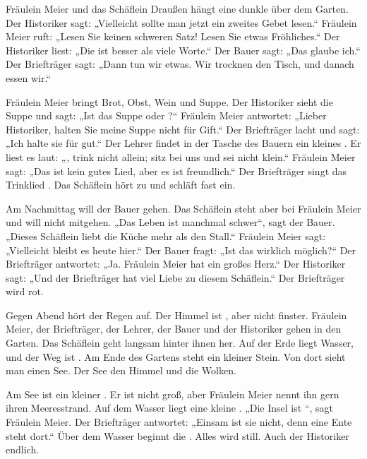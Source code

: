 \documentclass[12pt]{nextbook}
\begin{document}
\begin{readersection}{Fräulein Meier und das Schäflein}
Draußen hängt eine dunkle  über dem Garten. Der Historiker sagt: „Vielleicht sollte man jetzt ein zweites Gebet lesen.“ Fräulein Meier ruft: „Lesen Sie keinen schweren Satz! Lesen Sie etwas Fröhliches.“ Der Historiker liest: „Die  ist besser als viele Worte.“ Der Bauer sagt: „Das glaube ich.“ Der Briefträger sagt: „Dann tun wir etwas. Wir trocknen den Tisch, und danach essen wir.“

Fräulein Meier bringt Brot, Obst, Wein und Suppe. Der Historiker sieht die Suppe und sagt: „Ist das Suppe oder ?“ Fräulein Meier antwortet: „Lieber Historiker, halten Sie meine Suppe nicht für Gift.“ Der Briefträger lacht und sagt: „Ich halte sie für gut.“ Der Lehrer findet in der Tasche des Bauern ein kleines . Er liest es laut: „, trink nicht allein; sitz bei uns und sei nicht klein.“ Fräulein Meier sagt: „Das ist kein gutes Lied, aber es ist freundlich.“ Der Briefträger singt das Trinklied . Das Schäflein hört zu und schläft fast ein.

Am Nachmittag will der Bauer gehen. Das Schäflein steht aber bei Fräulein Meier und will nicht mitgehen. „Das Leben ist manchmal schwer“, sagt der Bauer. „Dieses Schäflein liebt die Küche mehr als den Stall.“ Fräulein Meier sagt: „Vielleicht bleibt es heute hier.“ Der Bauer fragt: „Ist das wirklich möglich?“ Der Briefträger antwortet: „Ja. Fräulein Meier hat ein großes Herz.“ Der Historiker sagt: „Und der Briefträger hat viel Liebe zu diesem Schäflein.“ Der Briefträger wird rot.

Gegen Abend hört der Regen auf. Der Himmel ist , aber nicht finster. Fräulein Meier, der Briefträger, der Lehrer, der Bauer und der Historiker gehen in den Garten. Das Schäflein geht langsam hinter ihnen her. Auf der Erde liegt Wasser, und der Weg ist . Am Ende des Gartens steht ein kleiner Stein. Von dort sieht man einen See. Der See  den Himmel und die Wolken.

Am See ist ein kleiner . Er ist nicht groß, aber Fräulein Meier nennt ihn gern ihren Meeresstrand. Auf dem Wasser liegt eine kleine . „Die Insel ist “, sagt Fräulein Meier. Der Briefträger antwortet: „Einsam ist sie nicht, denn eine Ente steht dort.“ Über dem Wasser beginnt die . Alles wird still. Auch der Historiker  endlich.


\end{readersection}
\end{document}

